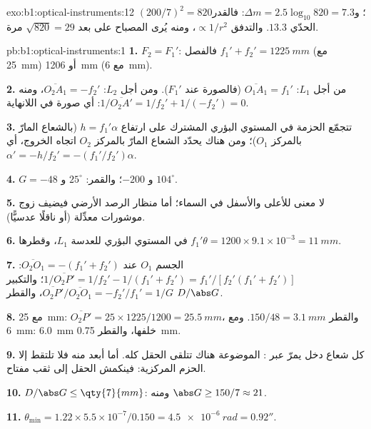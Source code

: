 \begin{solution}{exo:b1:optical-instruments:12}
$(200/7)^2 = 820$؛ و$\Delta m = 2.5\log_{10}820 = 7.3$: فالقدر
الحدّي $13.3$. والتدفق $\propto 1/r^2$، ومنه يُرى المصباح
على بعد $\sqrt{820} = 29$ مرة.
\end{solution}

\begin{solution}{pb:b1:optical-instruments:1}
\textbf{1.} $F_2 = F_1'$: فالفصل $f_1' + f_2' = \qty{1225}{mm}$
(مع  \qty{25}{mm}) أو \qty{1206}{mm} (مع \qty{6}{mm}).

\textbf{2.} من أجل $L_1$: $\overline{O_1A_1} = f_1'$ (فالصورة عند $F_1'$). ومن أجل $L_2$:
$\overline{O_2A_1} = -f_2'$، ومنه $1/\overline{O_2A'} = 1/f_2' + 1/(-f_2')
= 0$: أي صورة في اللانهاية.

\textbf{3.} تتجمّع الحزمة في المستوي البؤري المشترك على ارتفاع $h =
f_1'\alpha$ (بالشعاع المارّ بالمركز $O_1$)؛ ومن هناك يحدّد الشعاع المارّ بالمركز $O_2$
اتجاه الخروج، أي $\alpha' = -h/f_2' = -(f_1'/f_2')\alpha$.

\textbf{4.} $G = -48$ و $-200$؛ والقمر: $25^\circ$ و $104^\circ$.

\textbf{5.} لا معنى للأعلى والأسفل في السماء؛ أما منظار الرصد الأرضي
فيضيف زوج موشورات معدِّلة (أو ناقلًا عدسيًّا).

\textbf{6.} في المستوي البؤري للعدسة $L_1$، وقطرها $f_1'\theta = 1200 \times
9.1\times10^{-3} = \qty{11}{mm}$.

\textbf{7.} الجسم $O_1$ عند $\overline{O_2O_1} = -(f_1' + f_2')$:
$1/\overline{O_2P'} = 1/f_2' - 1/(f_1' + f_2') = f_1'/[f_2'(f_1' + f_2')]$؛
والتكبير $\overline{O_2P'}/\overline{O_2O_1} = -f_2'/f_1' = 1/G$،
والقطر $D/\abs G$.

\textbf{8.} مع \qty{25}{mm}: $\overline{O_2P'} = 25 \times 1225/1200 =
\qty{25.5}{mm}$، والقطر $150/48 = \qty{3.1}{mm}$. ومع \qty{6}{mm}:
\qty{6.0}{mm} خلفها، والقطر \qty{0.75}{mm}.

\textbf{9.} كل شعاع دخل  يمرّ عبر :  الموضوعة هناك تتلقى الحقل كله. أما أبعد منه
فلا تلتقط إلا الحزم المركزية: فينكمش الحقل إلى ثقب مفتاح.

\textbf{10.} $D/\abs G \leq \qty{7}{mm}$: ومنه $\abs G \geq 150/7 \approx 21$.

\textbf{11.} $\theta_{\min} = 1.22 \times 5.5\times10^{-7}/0.150 =
\qty{4.5e-6}{rad} = 0.92''$.


\end{solution}
